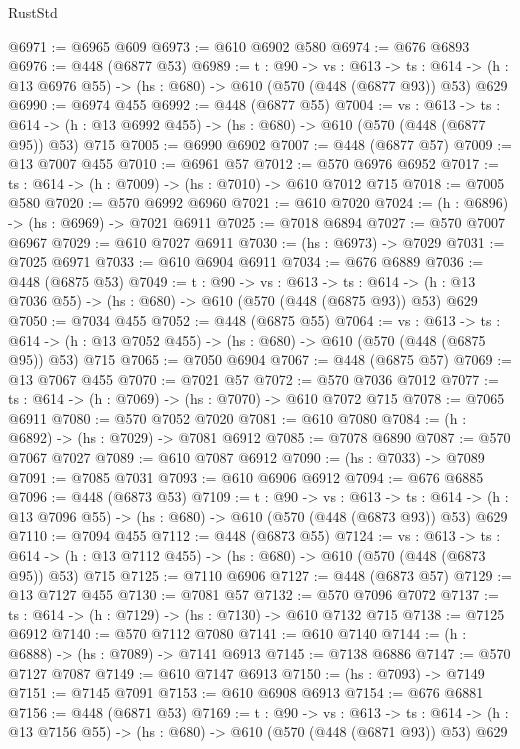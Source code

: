 \begin{lexlean}{RustStd}
\begin{coremodule}
@6971 := @6965 @609
@6973 := @610 @6902 @580
@6974 := @676 @6893
@6976 := @448 (@6877 @53)
@6989 := {t : @90} ->
  {vs : @613} ->
  {ts : @614} -> (h : @13 @6976 @55) -> (hs : @680) -> @610 (@570 (@448 (@6877 @93)) @53) @629
@6990 := @6974 @455
@6992 := @448 (@6877 @55)
@7004 := {vs : @613} ->
  {ts : @614} -> (h : @13 @6992 @455) -> (hs : @680) -> @610 (@570 (@448 (@6877 @95)) @53) @715
@7005 := @6990 @6902
@7007 := @448 (@6877 @57)
@7009 := @13 @7007 @455
@7010 := @6961 @57
@7012 := @570 @6976 @6952
@7017 := {ts : @614} -> (h : @7009) -> (hs : @7010) -> @610 @7012 @715
@7018 := @7005 @580
@7020 := @570 @6992 @6960
@7021 := @610 @7020
@7024 := (h : @6896) -> (hs : @6969) -> @7021 @6911
@7025 := @7018 @6894
@7027 := @570 @7007 @6967
@7029 := @610 @7027 @6911
@7030 := (hs : @6973) -> @7029
@7031 := @7025 @6971
@7033 := @610 @6904 @6911
@7034 := @676 @6889
@7036 := @448 (@6875 @53)
@7049 := {t : @90} ->
  {vs : @613} ->
  {ts : @614} -> (h : @13 @7036 @55) -> (hs : @680) -> @610 (@570 (@448 (@6875 @93)) @53) @629
@7050 := @7034 @455
@7052 := @448 (@6875 @55)
@7064 := {vs : @613} ->
  {ts : @614} -> (h : @13 @7052 @455) -> (hs : @680) -> @610 (@570 (@448 (@6875 @95)) @53) @715
@7065 := @7050 @6904
@7067 := @448 (@6875 @57)
@7069 := @13 @7067 @455
@7070 := @7021 @57
@7072 := @570 @7036 @7012
@7077 := {ts : @614} -> (h : @7069) -> (hs : @7070) -> @610 @7072 @715
@7078 := @7065 @6911
@7080 := @570 @7052 @7020
@7081 := @610 @7080
@7084 := (h : @6892) -> (hs : @7029) -> @7081 @6912
@7085 := @7078 @6890
@7087 := @570 @7067 @7027
@7089 := @610 @7087 @6912
@7090 := (hs : @7033) -> @7089
@7091 := @7085 @7031
@7093 := @610 @6906 @6912
@7094 := @676 @6885
@7096 := @448 (@6873 @53)
@7109 := {t : @90} ->
  {vs : @613} ->
  {ts : @614} -> (h : @13 @7096 @55) -> (hs : @680) -> @610 (@570 (@448 (@6873 @93)) @53) @629
@7110 := @7094 @455
@7112 := @448 (@6873 @55)
@7124 := {vs : @613} ->
  {ts : @614} -> (h : @13 @7112 @455) -> (hs : @680) -> @610 (@570 (@448 (@6873 @95)) @53) @715
@7125 := @7110 @6906
@7127 := @448 (@6873 @57)
@7129 := @13 @7127 @455
@7130 := @7081 @57
@7132 := @570 @7096 @7072
@7137 := {ts : @614} -> (h : @7129) -> (hs : @7130) -> @610 @7132 @715
@7138 := @7125 @6912
@7140 := @570 @7112 @7080
@7141 := @610 @7140
@7144 := (h : @6888) -> (hs : @7089) -> @7141 @6913
@7145 := @7138 @6886
@7147 := @570 @7127 @7087
@7149 := @610 @7147 @6913
@7150 := (hs : @7093) -> @7149
@7151 := @7145 @7091
@7153 := @610 @6908 @6913
@7154 := @676 @6881
@7156 := @448 (@6871 @53)
@7169 := {t : @90} ->
  {vs : @613} ->
  {ts : @614} -> (h : @13 @7156 @55) -> (hs : @680) -> @610 (@570 (@448 (@6871 @93)) @53) @629

\end{coremodule}
\end{lexlean}
